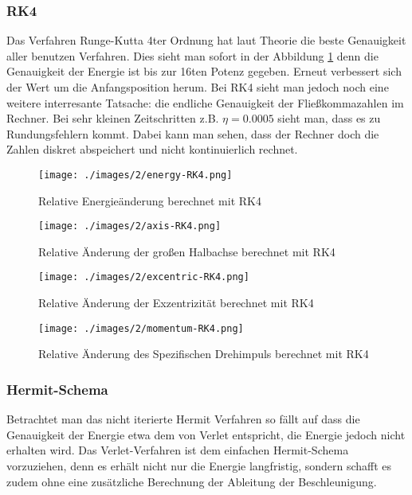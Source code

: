 \subsubsection{RK4}
Das Verfahren Runge-Kutta 4ter Ordnung hat laut Theorie die beste Genauigkeit aller
benutzen Verfahren. Dies sieht man sofort in der Abbildung \ref{fig:2body:rk4:energy}
denn die Genauigkeit der Energie ist bis zur 16ten Potenz gegeben. Erneut verbessert
sich der Wert um die Anfangsposition herum. Bei RK4 sieht man jedoch noch eine weitere
interresante Tatsache: die endliche Genauigkeit der Fließkommazahlen im Rechner.
Bei sehr kleinen Zeitschritten z.B. $\eta = 0.0005$ sieht man, dass es zu Rundungsfehlern kommt.
Dabei kann man sehen, dass der Rechner doch die Zahlen diskret abspeichert und nicht kontinuierlich
rechnet.
\begin{figure}
  \begin{center}
    \texttt{[image: ./images/2/energy-RK4.png]}
  \end{center}
  \caption{Relative Energieänderung berechnet mit RK4}
  \label{fig:2body:rk4:energy}
\end{figure}
\begin{figure}
  \begin{center}
    \texttt{[image: ./images/2/axis-RK4.png]}
  \end{center}
  \caption{Relative \"Anderung der großen Halbachse berechnet mit RK4}
  \label{fig:2body:rk4:axis}
\end{figure}
\begin{figure}
  \begin{center}
    \texttt{[image: ./images/2/excentric-RK4.png]}
  \end{center}
  \caption{Relative \"Anderung der Exzentrizität berechnet mit RK4}
  \label{fig:2body:rk4:excentric}
\end{figure}
\begin{figure}
  \begin{center}
    \texttt{[image: ./images/2/momentum-RK4.png]}
  \end{center}
  \caption{Relative \"Anderung des Spezifischen Drehimpuls berechnet mit RK4}
  \label{fig:2body:rk4:spec_angular_momentum}
\end{figure}
\subsubsection{Hermit-Schema}
Betrachtet man das nicht iterierte Hermit Verfahren so fällt
auf dass die Genauigkeit der Energie etwa dem von Verlet entspricht, die Energie
jedoch nicht erhalten wird. Das Verlet-Verfahren ist dem einfachen Hermit-Schema vorzuziehen,
denn es erhält nicht nur die Energie langfristig, sondern schafft es zudem
ohne eine zusätzliche Berechnung der Ableitung der Beschleunigung.\newline\newline
